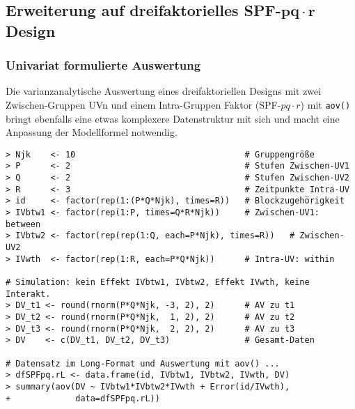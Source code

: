 \subsection[Erweiterung auf dreifaktorielles SPF-\texorpdfstring{$pq \cdot r$}{pq.r} Design]{Erweiterung auf dreifaktorielles SPF-$\bm{pq \cdot r}$ Design}

\subsubsection{Univariat formulierte Auswertung}

Die varianzanalytische Auswertung eines dreifaktoriellen Designs mit zwei Zwischen-Gruppen UVn und einem Intra-Gruppen Faktor (SPF-$pq \cdot r$) mit \lstinline!aov()! bringt ebenfalls eine etwas komplexere Datenstruktur mit sich und macht eine Anpassung der Modellformel notwendig.
\begin{lstlisting}
> Njk    <- 10                                  # Gruppengröße
> P      <- 2                                   # Stufen Zwischen-UV1
> Q      <- 2                                   # Stufen Zwischen-UV2
> R      <- 3                                   # Zeitpunkte Intra-UV
> id     <- factor(rep(1:(P*Q*Njk), times=R))   # Blockzugehörigkeit
> IVbtw1 <- factor(rep(1:P, times=Q*R*Njk))     # Zwischen-UV1: between
> IVbtw2 <- factor(rep(rep(1:Q, each=P*Njk), times=R))   # Zwischen-UV2
> IVwth  <- factor(rep(1:R, each=P*Q*Njk))      # Intra-UV: within

# Simulation: kein Effekt IVbtw1, IVbtw2, Effekt IVwth, keine Interakt.
> DV_t1 <- round(rnorm(P*Q*Njk, -3, 2), 2)      # AV zu t1
> DV_t2 <- round(rnorm(P*Q*Njk,  1, 2), 2)      # AV zu t2
> DV_t3 <- round(rnorm(P*Q*Njk,  2, 2), 2)      # AV zu t3
> DV    <- c(DV_t1, DV_t2, DV_t3)               # Gesamt-Daten

# Datensatz im Long-Format und Auswertung mit aov() ...
> dfSPFpq.rL <- data.frame(id, IVbtw1, IVbtw2, IVwth, DV)
> summary(aov(DV ~ IVbtw1*IVbtw2*IVwth + Error(id/IVwth),
+             data=dfSPFpq.rL))
\end{lstlisting}

